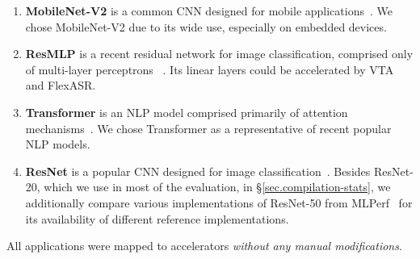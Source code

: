 \begin{enumerate}[leftmargin=*]
\item \textbf{MobileNet-V2} is a common CNN designed for mobile applications~\cite{howard2017mobilenets, sandler2019mobilenetv2}. We chose MobileNet-V2 due to its wide use, especially on embedded devices.

\item \textbf{ResMLP} is a recent residual network for image classification, comprised only of multi-layer perceptrons ~\cite{touvron2021resmlp}. Its linear layers could be accelerated by VTA and FlexASR.


\item \textbf{Transformer} is an NLP model comprised primarily of attention mechanisms~\cite{vaswani2017attention}. 
We chose Transformer as a representative of recent popular NLP models. 

\item \textbf{ResNet} is a popular CNN designed for image classification~\cite{he2016deep}. 
Besides ResNet-20, which we use in most of the evaluation, in \S\ref{sec.compilation-stats}, we additionally compare various implementations of ResNet-50 from MLPerf~\cite{mlperf} for its availability of different reference implementations.



\end{enumerate}
%
All applications were mapped to accelerators \emph{without any manual modifications}.
